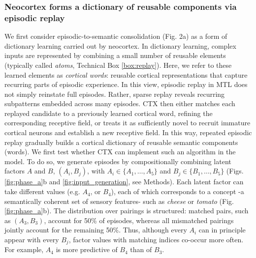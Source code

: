 \documentclass{article}
\begin{document}
\subsubsection*{Neocortex forms a dictionary of reusable components via episodic replay}
We first consider episodic-to-semantic consolidation (Fig. 2a) as a form of dictionary learning carried out by neocortex. In dictionary learning, complex inputs are represented by combining a small number of reusable elements (typically called \textit{atoms}, Technical Box \ref{box:replay}). Here, we refer to these learned elements as \textit{cortical words}: reusable cortical representations that capture recurring parts of episodic experience. In this view, episodic replay in MTL does not simply reinstate full episodes. Rather, sparse replay reveals recurring subpatterns embedded across many episodes. CTX then either matches each replayed candidate to a previously learned cortical word, refining the corresponding receptive field, or treats it as sufficiently novel to recruit immature cortical neurons and establish a new receptive field. In this way, repeated episodic replay gradually builds a cortical dictionary of reusable semantic components (words).
\newline\newline
We first test whether CTX can implement such an algorithm in the model. To do so, we generate episodes by compositionally combining latent factors $A$ and $B$, $(A_i,B_j)$, with $A_i \in \{A_1,\dots,A_5\}$ and $B_j \in \{B_1,\dots,B_5\}$ (Figs. \ref{fig:phase_a}b and \ref{fig:input_generation}, see Methods). Each latent factor can take different values (e.g. $A_4$, or $B_4$), each of which corresponds to a concept -a semantically coherent set of sensory features- such as \textit{cheese} or \textit{tomato} (Fig. \ref{fig:phase_a}b). The distribution over pairings is structured: matched pairs, such as $(A_3,B_3)$, account for 50\% of episodes, whereas all mismatched pairings jointly account for the remaining 50\%. Thus, although every $A_i$ can in principle appear with every $B_j$, factor values with matching indices co-occur more often. For example, $A_4$ is more predictive of $B_4$ than of $B_3$.
\newline\newline
\end{document}
